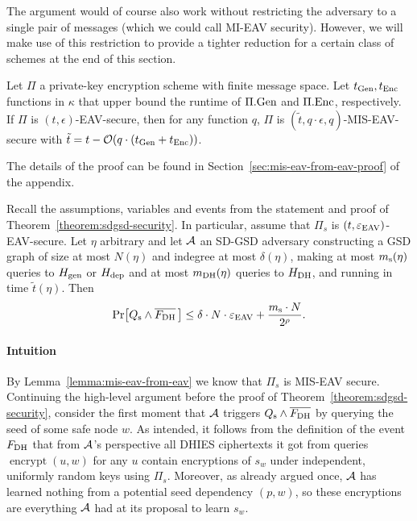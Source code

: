 The argument would of course also work without restricting the adversary to a single pair of messages (which we could call MI-EAV security). However, we will make use of this restriction to provide a tighter reduction for a certain class of schemes at the end of this section.

\begin{lemma} \label{lemma:mis-eav-from-eav}
	Let $\Pi$ a private-key encryption scheme with finite message space. Let $t_{\mathrm{Gen}}, t_{\mathrm{Enc}}$ functions in $\kappa$ that upper bound the runtime of $\Pi.\mathrm{Gen}$ and $\Pi.\mathrm{Enc}$, respectively. If $\Pi$ is $(t, \epsilon)$-EAV-secure, then for any function $q$, $\Pi$ is $(\tilde{t}, q \cdot \epsilon, q)$-MIS-EAV-secure with $\tilde{t} = t - \mathcal{O}(q \cdot (t_{\mathrm{Gen}} + t_{\mathrm{Enc}}))$.
\end{lemma}

The details of the proof can be found in Section~\ref{sec:mis-eav-from-eav-proof} of the appendix.

\begin{lemma} \label{lemma:eav-reduction}
	Recall the assumptions, variables and events from the statement and proof of Theorem~\ref{theorem:sdgsd-security}. In particular, assume that $\Pi_s$ is $(t, \varepsilon_\mathrm{EAV})$-EAV-secure. Let $\eta$ arbitrary and let $\mathcal{A}$ an SD-GSD adversary constructing a GSD graph of size at most $N(\eta)$ and indegree at most $\delta(\eta)$, making at most $m_\mathrm{s}(\eta)$ queries to $H_\mathrm{gen}$ or $H_\mathrm{dep}$ and at most $m_\mathrm{DH}(\eta)$ queries to $H_\mathrm{DH}$, and running in time $\tilde{t}(\eta)$. Then
	\[
		\pr{\qs \land \overline{\fdh}\,} \le \delta \cdot N \cdot \eeav + \frac{\ms \cdot N}{2^\rho}.
	\]
\end{lemma}

\paragraph{Intuition} By Lemma~\vref{lemma:mis-eav-from-eav} we know that $\Pi_s$ is MIS-EAV secure. Continuing the high-level argument before the proof of Theorem~\ref{theorem:sdgsd-security}, consider the first moment that $\mathcal{A}$ triggers $Q_\mathrm{s} \land \overline{F_\mathrm{DH}}$ by querying the seed of some safe node $w$.  As intended, it follows from the definition of the event $F_\mathrm{DH}$ that from $\mathcal{A}$'s perspective all DHIES ciphertexts it got from queries $\operatorname{encrypt}(u, w)$ for any $u$ contain encryptions of $s_w$ under independent, uniformly random keys using $\Pi_s$. Moreover, as already argued once, $\mathcal{A}$ has learned nothing from a potential seed dependency $(p, w)$, so these encryptions are everything $\mathcal{A}$ had at its proposal to learn $s_w$.

